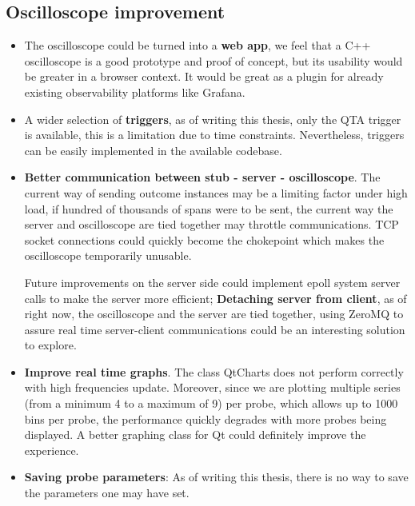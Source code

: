         \subsection{Oscilloscope improvement}
           \begin{itemize}
            
                \item The oscilloscope could be turned into a \textbf{web app}, we feel that a C++ oscilloscope is a good prototype and proof of concept, but its usability would be greater in a browser context. It would be great as a plugin for already existing observability platforms like Grafana.
            
                \item A wider selection of \textbf{triggers}, as of writing this thesis, only the QTA trigger is available, this is a limitation due to time constraints. Nevertheless, triggers can be easily implemented in the available codebase.
            
                \item \textbf{Better communication between stub - server - oscilloscope}. The current way of sending outcome instances may be a limiting factor under high load, if hundred of thousands of spans were to be sent, the current way the server and oscilloscope are tied together may throttle communications. TCP socket connections could quickly become the chokepoint which makes the oscilloscope temporarily unusable.

            Future improvements on the server side could implement epoll system server calls to make the server more efficient; \textbf{Detaching server from client}, as of right now, the oscilloscope and the server are tied together, using ZeroMQ to assure real time server-client communications could be an interesting solution to explore.

                \item \textbf{Improve real time graphs}. The class QtCharts does not perform correctly with high frequencies update. Moreover, since we are plotting multiple series (from a minimum 4 to a maximum of 9) per probe, which allows up to 1000 bins per probe, the performance quickly degrades with more probes being displayed. A better graphing class for Qt could definitely improve the experience.

                \item \textbf{Saving probe parameters}: As of writing this thesis, there is no way to save the parameters one may have set. 
           \end{itemize} 
            
